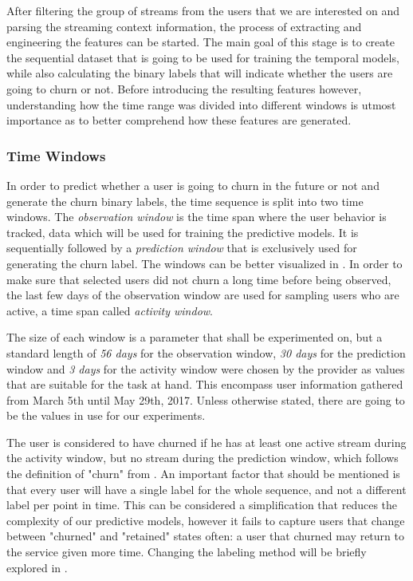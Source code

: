 \documentclass{kththesis}
\begin{document}
After filtering the group of streams from the users that we are interested on and parsing the streaming context information, the process of extracting and engineering the features can be started. The main goal of this stage is to create the sequential dataset that is going to be used for training the temporal models, while also calculating the binary labels that will indicate whether the users are going to churn or not. Before introducing the resulting features however, understanding how the time range was divided into different windows is utmost importance as to better comprehend how these features are generated.

\subsubsection{Time Windows}

In order to predict whether a user is going to churn in the future or not and generate the churn binary labels, the time sequence is split into two time windows. The \emph{observation window} is the time span where the user behavior is tracked, data which will be used for training the predictive models. It is sequentially followed by a \emph{prediction window} that is exclusively used for generating the churn label. The windows can be better visualized in . In order to make sure that selected users did not churn a long time before being observed, the last few days of the observation window are used for sampling users who are active, a time span called \emph{activity window}. 

The size of each window is a parameter that shall be experimented on, but a standard length of \emph{56 days} for the observation window, \emph{30 days} for the prediction window and \emph{3 days} for the activity window were chosen by the provider as values that are suitable for the task at hand. This encompass user information gathered from March 5th until May 29th, 2017. Unless otherwise stated, there are going to be the values in use for our experiments.

The user is considered to have churned if he has at least one active stream during the activity window, but no stream during the prediction window, which follows the definition of "churn" from . An important factor that should be mentioned is that every user will have a single label for the whole sequence, and not a different label per point in time. This can be considered a simplification that reduces the complexity of our predictive models, however it fails to capture users that change between "churned" and "retained" states often: a user that churned may return to the service given more time. Changing the labeling method will be briefly explored in .
\end{document}

